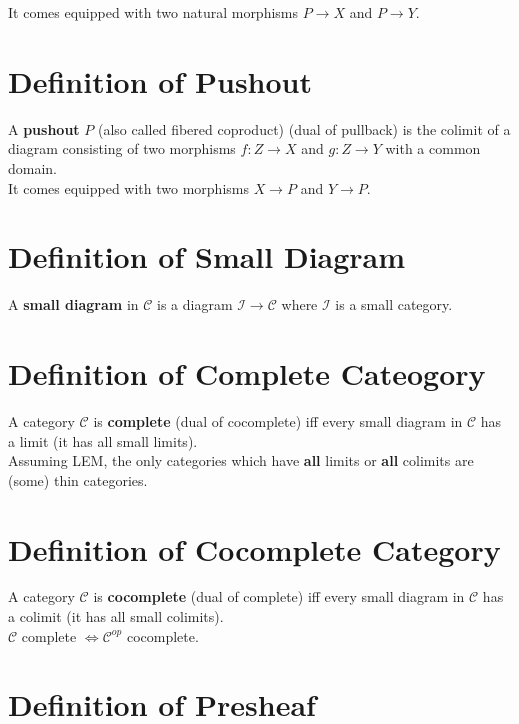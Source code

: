\documentclass[a4paper, twoside, english, 11pt]{book}
\newcommand{\C}{\mathcal C}
\newcommand{\I}{\mathcal I}
\begin{document}
\noindent
It comes equipped with two natural morphisms $P \rightarrow X$ and $P \rightarrow Y$.



\section{Definition of Pushout}

A \textbf{pushout} $P$ (also called fibered coproduct) (dual of pullback) is the colimit of a diagram consisting of two morphisms $f : Z \rightarrow X$ and $g : Z \rightarrow Y$ with a common domain. \\

\noindent
It comes equipped with two morphisms $X \rightarrow P$ and $Y \rightarrow P$.



\section{Definition of Small Diagram}

A \textbf{small diagram} in $\C$ is a diagram $\I \rightarrow \C$ where $\I$ is a small category.



\section{Definition of Complete Cateogory}

A category $\C$ is \textbf{complete} (dual of cocomplete) iff every small diagram in $\C$ has a limit (it has all small limits). \\

\noindent
Assuming LEM, the only categories which have \textbf{all} limits or \textbf{all} colimits are (some) thin categories.



\section{Definition of Cocomplete Category}

A category $\C$ is \textbf{cocomplete} (dual of complete) iff every small diagram in $\C$ has a colimit (it has all small colimits). \\

\noindent
$\C$ complete $\iff \C^{op}$ cocomplete.



\section{Definition of Presheaf}
\end{document}
